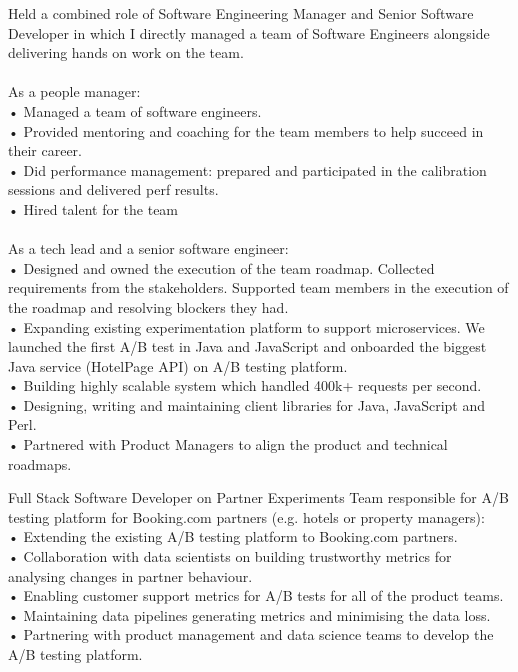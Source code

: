 \documentclass[11pt,a4paper]{moderncv-xetex}
\begin{document}
{
Held a combined role of Software Engineering Manager and Senior Software Developer in which I directly managed a team of Software Engineers alongside delivering hands on work on the team.
\\
\\
As a people manager:
\\
 • Managed a team of software engineers.
\\
 • Provided mentoring and coaching for the team members to help succeed in their career.
\\
 • Did performance management: prepared and participated in the calibration sessions and delivered perf results.
\\
 • Hired talent for the team
\\
\\
As a tech lead and a senior software engineer:
\\
 • Designed and owned the execution of the team roadmap. Collected requirements from the stakeholders. Supported team members in the execution of the roadmap and resolving blockers they had.
\\
 • Expanding existing experimentation platform to support microservices. We launched the first A/B test in Java and JavaScript and onboarded the biggest Java service (HotelPage API) on A/B testing platform.
\\
 • Building highly scalable system which handled 400k+ requests per second.
\\
 • Designing, writing and maintaining client libraries for Java, JavaScript and Perl.
\\
 • Partnered with Product Managers to align the product and technical roadmaps.
}


{
Full Stack Software Developer on Partner Experiments Team responsible for A/B testing platform for Booking.com partners (e.g. hotels or property managers):
\\
 • Extending the existing A/B testing platform to Booking.com partners.
\\
 • Collaboration with data scientists on building trustworthy metrics for analysing changes in partner behaviour.
\\
 • Enabling customer support metrics for A/B tests for all of the product teams.
\\
 • Maintaining data pipelines generating metrics and minimising the data loss.
\\
 • Partnering with product management and data science teams to develop the A/B testing platform.
}
    
\end{document}
